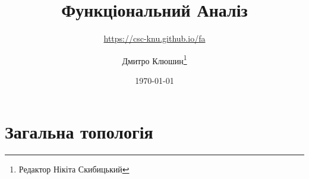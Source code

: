 \documentclass[a4paper,11pt,twoside=semi,openright,numbers=noenddot]{scrbook}
\title{Функціональний Аналіз}
\subtitle{\url{https://csc-knu.github.io/fa}}
\author{Дмитро Клюшин\thanks{Редактор Нікіта Скибицький}}
\date{\today}
\begin{document}


% 
% 
% 
% 



\part{Загальна топологія}
\parttoc






% 
% 
% 
% 
% 

% 
% 
% 
% 
% 
% 
% 

% 
% 
% 
% 
% 

% 
% 
% 
% 

% 
% 
% 
% 
% 
% 

\end{document}
